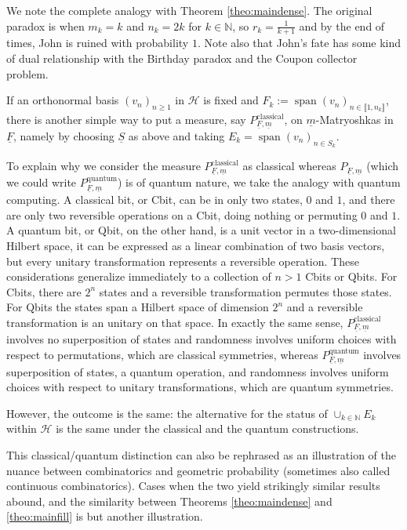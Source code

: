 \documentclass[pdftex]{sigma}%
\DeclareMathOperator{\psan}{span}
\newcommand{\hilH}{\mathcal H}
\newcommand{\kN}{k\in \mathbb{N}}
\newcommand{\intt}[1]{\llbracket #1 \rrbracket}
\begin{document}
We note the complete analogy with Theorem \ref{theo:maindense}. The original paradox is when $m_k=k$ and $n_k=2k$ for $\kN$, so $r_k=\frac{1}{k+1}$ and by the end of times, John is ruined with probability $1$. Note also that John's fate has some kind of dual relationship with the Birthday paradox and the Coupon collector problem.

If an orthonormal basis $(v_n)_{n\geq 1}$ in $\hilH$ is fixed and $F_k:=\psan (v_n)_{n\in \intt{1,n_k}}$, there is another simple way to put a measure, say $P_{\underline{F},\underline{m}}^{\text{classical}}$, on $\underline{m}$-Matryoshkas in $\underline{F}$, namely by choosing $\underline{S}$ as above and taking $E_k=\psan (v_n)_{n\in S_k}$.

To explain why we consider the measure $P_{\underline{F},\underline{m}}^{\text{classical}}$ as classical whereas $P_{\underline{F},\underline{m}}$ \big(which we could write $P_{\underline{F},\underline{m}}^{\text{quantum}}$\big) is of quantum nature, we take the analogy with quantum computing. A classical bit, or Cbit, can be in only two states, $0$ and $1$, and there are only two reversible operations on a Cbit, doing nothing or permuting $0$ and $1$. A quantum bit, or Qbit, on the other hand, is a unit vector in a two-dimensional Hilbert space, it can be expressed as a linear combination of two basis vectors, but every unitary transformation represents a reversible operation. These considerations generalize immediately to a collection of $n>1$ Cbits or Qbits. For Cbits, there are $2^n$ states and a reversible transformation permutes those states. For Qbits the states span a Hilbert space of dimension $2^n$ and a reversible transformation is an unitary on that space. In exactly the same sense, $P_{\underline{F},\underline{m}}^{\text{classical}}$ involves no superposition of states and randomness involves uniform choices with respect to permutations, which are classical symmetries, whereas $P_{\underline{F},\underline{m}}^{\text{quantum}}$ involves superposition of states, a quantum operation, and randomness involves uniform choices with respect to unitary transformations, which are quantum symmetries.

However, the outcome is the same: the alternative for the status of $\cup_{\kN}E_k$ within $\hilH$ is the same under the classical and the quantum constructions.

This classical/quantum distinction can also be rephrased as an illustration of the nuance between combinatorics and geometric probability (sometimes also called continuous combinatorics). Cases when the two yield strikingly similar results abound, and the similarity between
Theorems \ref{theo:maindense} and \ref{theo:mainfill} is but another illustration.
\end{document}
